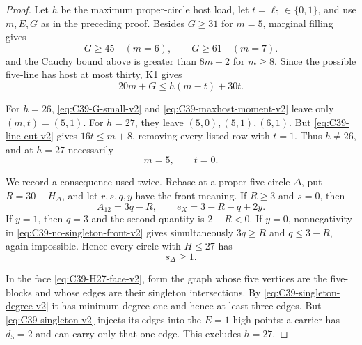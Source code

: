 \begin{proof}
Let \(h\) be the maximum proper-circle host load, let
\(t=\ell_5\in\{0,1\}\), and use \(m,E,G\) as in the preceding proof.
Besides \(G\ge31\) for \(m=5\), marginal filling gives
\begin{equation}\label{eq:C39-G-small-v2}
 G\ge45\quad(m=6),\qquad G\ge61\quad(m=7).
\end{equation}
and the Cauchy bound above is greater than \(8m+2\) for \(m\ge8\).
Since the possible five-line has host at most thirty, K1 gives
\begin{equation}\label{eq:C39-maxhost-moment-v2}
 20m+G\le h(m-t)+30t.
\end{equation}

For \(h=26\), \eqref{eq:C39-G-small-v2} and
\eqref{eq:C39-maxhost-moment-v2} leave
only \((m,t)=(5,1)\).  For \(h=27\), they
leave \((5,0),(5,1),(6,1)\).  But
\eqref{eq:C39-line-cut-v2} gives \(16t\le m+8\), removing every listed row
with \(t=1\).  Thus \(h\ne26\), and at \(h=27\) necessarily
\begin{equation}\label{eq:C39-H27-face-v2}
 m=5,\qquad t=0.
\end{equation}

We record a consequence used twice.  Rebase at a proper five-circle
\(\Delta\), put \(R=30-H_\Delta\), and let \(r,s,q,y\) have the front
meaning.  If \(R\ge3\) and \(s=0\), then
\begin{equation}\label{eq:C39-no-singleton-front-v2}
 A_{12}=3q-R,\qquad e_X=3-R-q+2y.
\end{equation}
If \(y=1\), then \(q=3\) and the second quantity is \(2-R<0\).  If
\(y=0\), nonnegativity in \eqref{eq:C39-no-singleton-front-v2} gives
simultaneously \(3q\ge R\) and
\(q\le3-R\), again impossible.  Hence every circle with \(H\le27\) has
\begin{equation}\label{eq:C39-singleton-degree-v2}
 s_\Delta\ge1.
\end{equation}

In the face \eqref{eq:C39-H27-face-v2}, form the graph whose five vertices
are the five-blocks and whose edges are their singleton intersections.  By
\eqref{eq:C39-singleton-degree-v2} it has minimum
degree one and hence at least three edges.  But
\eqref{eq:C39-singleton-v2} injects its edges into the \(E=1\) high points:
a carrier has \(d_5=2\) and can carry only that one edge.  This excludes
\(h=27\).


\end{proof}
